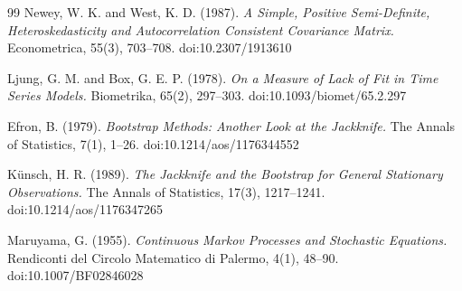 \documentclass[11pt]{article}
\begin{document}
\begin{thebibliography}{99}
Newey, W. K. and West, K. D. (1987).
\textit{A Simple, Positive Semi-Definite, Heteroskedasticity and Autocorrelation Consistent Covariance Matrix.}
Econometrica, 55(3), 703--708.
doi:10.2307/1913610

Ljung, G. M. and Box, G. E. P. (1978).
\textit{On a Measure of Lack of Fit in Time Series Models.}
Biometrika, 65(2), 297--303.
doi:10.1093/biomet/65.2.297

Efron, B. (1979).
\textit{Bootstrap Methods: Another Look at the Jackknife.}
The Annals of Statistics, 7(1), 1--26.
doi:10.1214/aos/1176344552

K\"unsch, H. R. (1989).
\textit{The Jackknife and the Bootstrap for General Stationary Observations.}
The Annals of Statistics, 17(3), 1217--1241.
doi:10.1214/aos/1176347265

Maruyama, G. (1955).
\textit{Continuous Markov Processes and Stochastic Equations.}
Rendiconti del Circolo Matematico di Palermo, 4(1), 48--90.
doi:10.1007/BF02846028

\end{thebibliography}
\end{document}
